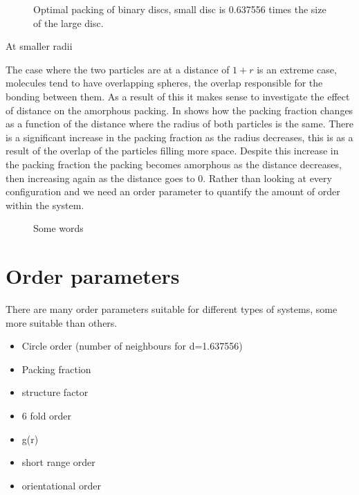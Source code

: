 \begin{figure}
    \caption{Optimal packing of binary discs, small disc is 0.637556 times the size of the large disc.}
    \label{crys:d=1.637556}
\end{figure}

At smaller radii 

The case where the two particles are at a distance of $1+r$ is an extreme case, molecules tend to have overlapping spheres, the overlap responsible for the bonding between them. As a result of this it makes sense to investigate the effect of distance on the amorphous packing. In  shows how the packing fraction changes as a function of the distance where the radius of both particles is the same. There is a significant increase in the packing fraction as the radius decreases, this is as a result of the overlap of the particles filling more space. Despite this increase in the packing fraction the packing becomes amorphous as the distance decreases, then increasing again as the distance goes to 0. Rather than looking at every configuration and we need an order parameter to quantify the amount of order within the system.

\begin{figure}
    \label{fig:var d fix r}
    \caption{Some words}
\end{figure}

\section{Order parameters}

There are many order parameters suitable for different types of systems, some more suitable than others.
\begin{itemize}
    \item Circle order (number of neighbours for d=1.637556)
    \item Packing fraction
    \item structure factor
    \item 6 fold order
    \item g(r)
    \item short range order
    \item orientational order
\end{itemize}

